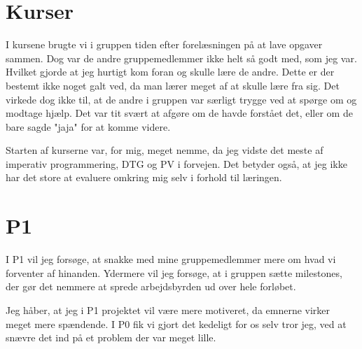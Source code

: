 \documentclass[10pt,a4paper]{article}
\begin{document}
\section*{Kurser}
I kursene brugte vi i gruppen tiden efter forelæsningen på at lave opgaver sammen. Dog var de andre gruppemedlemmer ikke helt så godt med, som jeg var. Hvilket gjorde at jeg hurtigt kom foran og skulle lære de andre. Dette er der bestemt ikke noget galt ved, da man lærer meget af at skulle lære fra sig. Det virkede dog ikke til, at de andre i gruppen var særligt trygge ved at spørge om og modtage hjælp. Det var tit svært at afgøre om de havde forstået det, eller om de bare sagde "jaja" for at komme videre.

Starten af kurserne var, for mig, meget nemme, da jeg vidste det meste af imperativ programmering, DTG og PV i forvejen. Det betyder også, at jeg ikke har det store at evaluere omkring mig selv i forhold til læringen.

\section*{P1}
I P1 vil jeg forsøge, at snakke med mine gruppemedlemmer mere om hvad vi forventer af hinanden. Ydermere vil jeg forsøge, at i gruppen sætte milestones, der gør det nemmere at sprede arbejdsbyrden ud over hele forløbet.

Jeg håber, at jeg i P1 projektet vil være mere motiveret, da emnerne virker meget mere spændende. I P0 fik vi gjort det kedeligt for os selv tror jeg, ved at snævre det ind på et problem der var meget lille.
\end{document}
